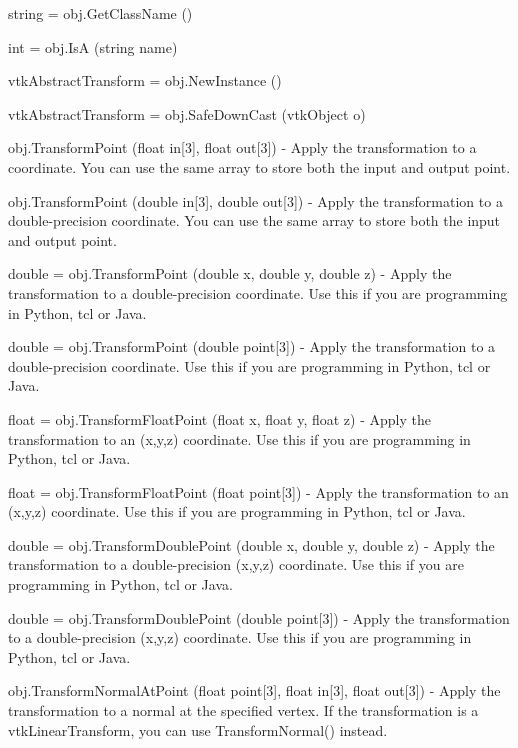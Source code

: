 \begin{DoxyItemize}
\item {\ttfamily string = obj.\-Get\-Class\-Name ()}  
\item {\ttfamily int = obj.\-Is\-A (string name)}  
\item {\ttfamily vtk\-Abstract\-Transform = obj.\-New\-Instance ()}  
\item {\ttfamily vtk\-Abstract\-Transform = obj.\-Safe\-Down\-Cast (vtk\-Object o)}  
\item {\ttfamily obj.\-Transform\-Point (float in\mbox{[}3\mbox{]}, float out\mbox{[}3\mbox{]})} -\/ Apply the transformation to a coordinate. You can use the same array to store both the input and output point.  
\item {\ttfamily obj.\-Transform\-Point (double in\mbox{[}3\mbox{]}, double out\mbox{[}3\mbox{]})} -\/ Apply the transformation to a double-\/precision coordinate. You can use the same array to store both the input and output point.  
\item {\ttfamily double = obj.\-Transform\-Point (double x, double y, double z)} -\/ Apply the transformation to a double-\/precision coordinate. Use this if you are programming in Python, tcl or Java.  
\item {\ttfamily double = obj.\-Transform\-Point (double point\mbox{[}3\mbox{]})} -\/ Apply the transformation to a double-\/precision coordinate. Use this if you are programming in Python, tcl or Java.  
\item {\ttfamily float = obj.\-Transform\-Float\-Point (float x, float y, float z)} -\/ Apply the transformation to an (x,y,z) coordinate. Use this if you are programming in Python, tcl or Java.  
\item {\ttfamily float = obj.\-Transform\-Float\-Point (float point\mbox{[}3\mbox{]})} -\/ Apply the transformation to an (x,y,z) coordinate. Use this if you are programming in Python, tcl or Java.  
\item {\ttfamily double = obj.\-Transform\-Double\-Point (double x, double y, double z)} -\/ Apply the transformation to a double-\/precision (x,y,z) coordinate. Use this if you are programming in Python, tcl or Java.  
\item {\ttfamily double = obj.\-Transform\-Double\-Point (double point\mbox{[}3\mbox{]})} -\/ Apply the transformation to a double-\/precision (x,y,z) coordinate. Use this if you are programming in Python, tcl or Java.  
\item {\ttfamily obj.\-Transform\-Normal\-At\-Point (float point\mbox{[}3\mbox{]}, float in\mbox{[}3\mbox{]}, float out\mbox{[}3\mbox{]})} -\/ Apply the transformation to a normal at the specified vertex. If the transformation is a vtk\-Linear\-Transform, you can use Transform\-Normal() instead.  

\end{DoxyItemize}
